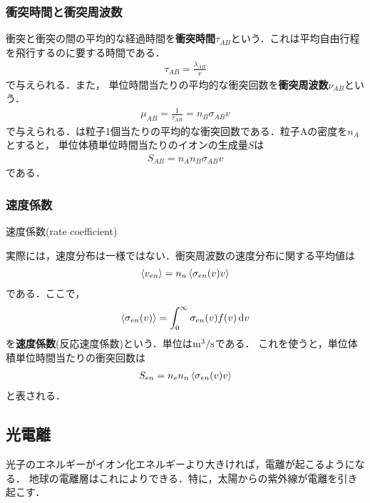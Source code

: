 \documentclass{report}
\begin{document}
      \subsubsection{衝突時間と衝突周波数}
        衝突と衝突の間の平均的な経過時間を\textbf{衝突時間}$\tau_{AB}$という．これは平均自由行程を飛行するのに要する時間である．
        \begin{align}
          \tau_{AB} = \frac{\lambda_{AB}}{v} \label{eq:collision_time}
        \end{align}
        で与えられる．また，
        単位時間当たりの平均的な衝突回数を\textbf{衝突周波数}$\nu_{AB}$という．
        \begin{align}
          \mu_{AB} = \frac{1}{\tau_{AB}} = n_B \sigma_{AB} v \label{eq:collision_frequency}
        \end{align}
        で与えられる．は粒子1個当たりの平均的な衝突回数である．粒子Aの密度を$n_A$とすると，
        単位体積単位時間当たりのイオンの生成量$S$は
        \begin{align}
          S_{AB} = n_A n_B \sigma_{AB} v
        \end{align}
        である．

      \subsubsection{速度係数}
        速度係数(rate coefficient)

        実際には，速度分布は一様ではない．衝突周波数の速度分布に関する平均値は
        \begin{align}
          \ev{v_{en}} = n_n \ev{\sigma_{en}(v)v}
        \end{align}
        である．ここで，
        \begin{align}
          \ev{\sigma_{en}(v)} = \int_0^{\infty} \sigma_{en}(v)f(v)\dd{v}
        \end{align}
        を\textbf{速度係数}(反応速度係数)という．単位は$\mathrm{m^3/s}$である．
        これを使うと，単位体積単位時間当たりの衝突回数は
        \begin{align}
          S_{en} = n_e n_n \ev{\sigma_{en}(v)v}
        \end{align}
        と表される．
\subsection{光電離}
光子のエネルギーがイオン化エネルギーより大きければ，電離が起こるようになる．
地球の電離層はこれによりできる．特に，太陽からの紫外線が電離を引き起こす．
\end{document}
